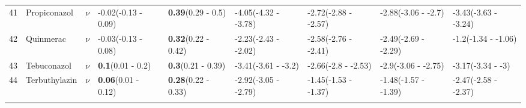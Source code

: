 \begin{landscape}
\begin{longtable}{lp{2cm}p{0.6cm}p{1.8cm}p{1.8cm}p{1.8cm}p{1.8cm}p{1.8cm}p{1.8cm}}
  41 & Propiconazol & $\nu$ & -0.02\newline (-0.13 - 0.09) & \textbf{0.39}\newline (0.29 - 0.5) & -4.05\newline (-4.32 - -3.78) & -2.72\newline (-2.88 - -2.57) & -2.88\newline (-3.06 - -2.7) & -3.43\newline (-3.63 - -3.24) \\ 
  42 & Quinmerac & $\nu$ & -0.03\newline (-0.13 - 0.08) & \textbf{0.32}\newline (0.22 - 0.42) & -2.23\newline (-2.43 - -2.02) & -2.58\newline (-2.76 - -2.41) & -2.49\newline (-2.69 - -2.29) & -1.2\newline (-1.34 - -1.06) \\ 
  43 & Tebuconazol & $\nu$ & \textbf{0.1}\newline (0.01 - 0.2) & \textbf{0.3}\newline (0.21 - 0.39) & -3.41\newline (-3.61 - -3.2) & -2.66\newline (-2.8 - -2.53) & -2.9\newline (-3.06 - -2.75) & -3.17\newline (-3.34 - -3) \\ 
  44 & Terbuthylazin & $\nu$ & \textbf{0.06}\newline (0.01 - 0.12) & \textbf{0.28}\newline (0.22 - 0.33) & -2.92\newline (-3.05 - -2.79) & -1.45\newline (-1.53 - -1.37) & -1.48\newline (-1.57 - -1.39) & -2.47\newline (-2.58 - -2.37) \\ 
   \bottomrule
\label{tab:var_model_coef}
\end{longtable}
\endgroup
\end{landscape}
